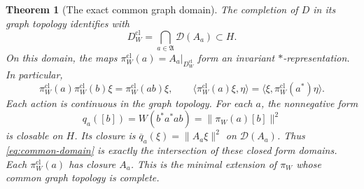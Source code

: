 \documentclass[11pt]{article}
\newtheorem{theorem}{Theorem}[section]
\theoremstyle{definition}
\theoremstyle{remark}
\numberwithin{equation}{section}
\begin{document}
\begin{theorem}[The exact common graph domain]
\label{thm:graph-domain}
The completion of $D$ in its graph topology identifies with
\begin{equation}
 D_W^{\mathrm{cl}}=\bigcap_{a\in\mathfrak A}\mathcal D(A_a)
 \subset H.
 \label{eq:common-domain}
\end{equation}
On this domain, the maps $\pi_W^{\mathrm{cl}}(a)=A_a|_{D_W^{\mathrm{cl}}}$
form an invariant $*$-representation.  In particular,
\begin{equation}
 \pi_W^{\mathrm{cl}}(a)\pi_W^{\mathrm{cl}}(b)\xi
 =\pi_W^{\mathrm{cl}}(ab)\xi,
 \qquad
 \langle\pi_W^{\mathrm{cl}}(a)\xi,\eta\rangle
 =\langle\xi,\pi_W^{\mathrm{cl}}(a^*)\eta\rangle.
 \label{eq:closed-products}
\end{equation}
Each action is continuous in the graph topology.
For each $a$, the nonnegative form
\[
 q_a([b])=W(b^*a^*ab)=\|\pi_W(a)[b]\|^2
\]
is closable on $H$.  Its closure is $\overline q_a(\xi)=\|A_a\xi\|^2$
on $\mathcal D(A_a)$.  Thus \eqref{eq:common-domain} is exactly the
intersection of these closed form domains.
Each $\pi_W^{\mathrm{cl}}(a)$ has closure $A_a$.  This is the
minimal extension of $\pi_W$ whose common graph topology is complete.
\end{theorem}
\end{document}
